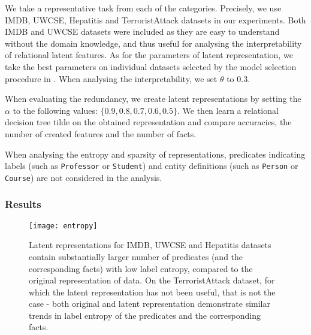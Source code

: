 We take a representative task from each of the categories.
Precisely, we use IMDB, UWCSE, Hepatitis and TerroristAttack datasets in our experiments.
Both IMDB and UWCSE datasets were included as they are easy to understand without the domain knowledge, and thus useful for analysing the interpretability of relational latent features.
As for the parameters of latent representation, we take the best parameters on individual datasets selected by the model selection procedure in \cite{Dumancic2017}.
When analysing the interpretability, we set $\theta$ to $0.3$.

When evaluating the redundancy, we create latent representations by setting the $\alpha$ to the following values: $\{0.9, 0.8, 0.7, 0.6, 0.5\}$.
We then learn a relational decision tree \gls{tilde} on the obtained representation and compare accuracies, the number of created features and the number of facts.


When analysing the entropy and sparsity of representations, predicates indicating labels (such as \texttt{Professor} or \texttt{Student}) and entity definitions (such as \texttt{Person} or \texttt{Course}) are not considered in the analysis.


\subsubsection{Results}


\begin{figure}[t]
	\centering
	\medskip
    \texttt{[image: entropy]}
    \caption[Label entropy of latent representation created by \gls{curled}]{Latent representations for IMDB, UWCSE and Hepatitis datasets contain substantially larger number of predicates (and the corresponding facts) with low label entropy, compared to the original representation of data. On the TerroristAttack dataset, for which the latent representation has not been useful, that is not the case - both original and latent representation demonstrate similar trends in label entropy of the predicates and the corresponding facts.}
    \label{fig:Entropy}
\end{figure}


